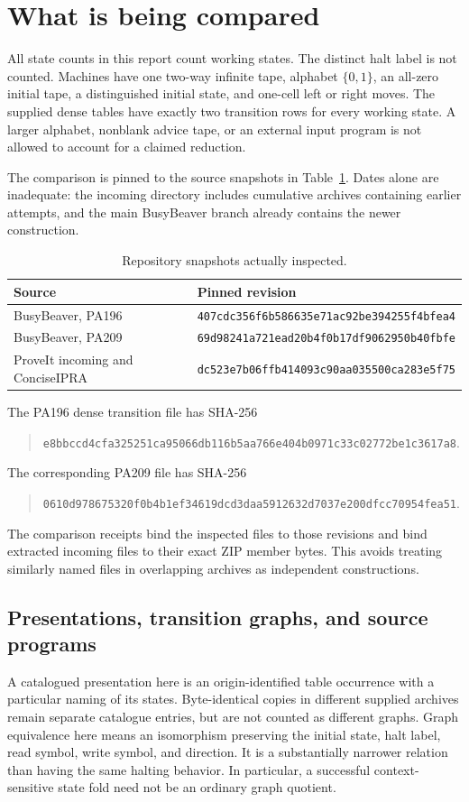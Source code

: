\section{What is being compared}
\label{sec:comparison}
All state counts in this report count working states. The distinct halt label is not counted. Machines have one two-way infinite tape, alphabet $\{0,1\}$, an all-zero initial tape, a distinguished initial state, and one-cell left or right moves. The supplied dense tables have exactly two transition rows for every working state. A larger alphabet, nonblank advice tape, or an external input program is not allowed to account for a claimed reduction.

The comparison is pinned to the source snapshots in Table~\ref{tab:pins}\cite{pa196,pa209,incoming}. Dates alone are inadequate: the incoming directory includes cumulative archives containing earlier attempts, and the main BusyBeaver branch already contains the newer construction.
\begin{table}[ht]
\centering\small
\begin{tabular}{p{.23\linewidth}p{.68\linewidth}}
\toprule
Source & Pinned revision\\
\midrule
BusyBeaver, PA196 & \nolinkurl{407cdc356f6b586635e71ac92be394255f4bfea4}\\
BusyBeaver, PA209 & \nolinkurl{69d98241a721ead20b4f0b17df9062950b40fbfe}\\
ProveIt incoming and ConciseIPRA & \nolinkurl{dc523e7b06ffb414093c90aa035500ca283e5f75}\\
\bottomrule
\end{tabular}
\caption{Repository snapshots actually inspected.}\label{tab:pins}
\end{table}

The PA196 dense transition file has SHA-256
\begin{quote}\small\nolinkurl{e8bbccd4cfa325251ca95066db116b5aa766e404b0971c33c02772be1c3617a8}.\end{quote}
The corresponding PA209 file has SHA-256
\begin{quote}\small\nolinkurl{0610d978675320f0b4b1ef34619dcd3daa5912632d7037e200dfcc70954fea51}.\end{quote}
The comparison receipts bind the inspected files to those revisions and bind extracted incoming files to their exact ZIP member bytes. This avoids treating similarly named files in overlapping archives as independent constructions.

\subsection{Presentations, transition graphs, and source programs}
A catalogued presentation here is an origin-identified table occurrence with a particular naming of its states. Byte-identical copies in different supplied archives remain separate catalogue entries, but are not counted as different graphs. Graph equivalence here means an isomorphism preserving the initial state, halt label, read symbol, write symbol, and direction. It is a substantially narrower relation than having the same halting behavior. In particular, a successful context-sensitive state fold need not be an ordinary graph quotient.

